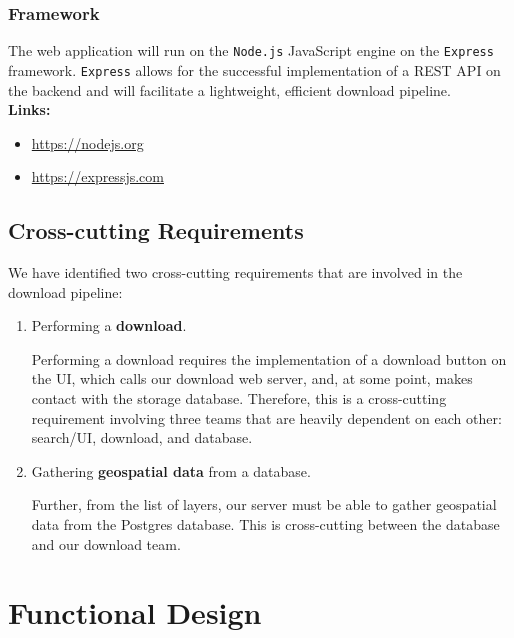 \documentclass{article}
\begin{document}
\subsubsection{Framework}

The web application will run on the \texttt{Node.js} JavaScript engine on the \texttt{Express} framework. \texttt{Express} allows for the successful implementation of a REST API on the backend and will facilitate a lightweight, efficient download pipeline. \\

\textbf{Links:}
\begin{itemize} 
	\item \url{https://nodejs.org}
	\item \url{https://expressjs.com}
\end{itemize}

\clearpage

\subsection{Cross-cutting Requirements}

We have identified two cross-cutting requirements that are involved in the download pipeline:  

\begin{enumerate}
\item Performing a \textbf{download}.

Performing a download requires the implementation of a download button on the UI, which calls our download web server, and, at some point, makes contact with the storage database. Therefore, this is a cross-cutting requirement involving three teams that are heavily dependent on each other: search/UI, download, and database. \\

\item Gathering \textbf{geospatial data} from a database.

Further, from the list of layers, our server must be able to gather geospatial data from the Postgres database. This is cross-cutting between the database and our download team.

\end{enumerate}

\clearpage

\section{Functional Design}
\end{document}
